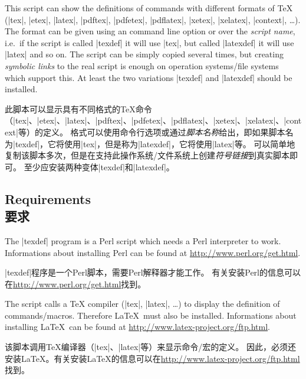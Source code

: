 \documentclass{article}
\begin{document}
This script can show the definitions of commands with different formats of TeX
(|tex|, |etex|, |latex|, |pdftex|, |pdfetex|, |pdflatex|, |xetex|, |xelatex|, |context|, \ldots).
The format can be given using an command line option or over the \emph{script name},
i.e.\ if the script is called |texdef| it will use |tex|, but called |latexdef|
it will use |latex| and so on.
The script can be simply copied several times, but creating \emph{symbolic links}
to the real script is enough on operation systems/file systems which support
this.
At least the two variations |texdef| and |latexdef| should be installed.

此脚本可以显示具有不同格式的TeX命令（|tex|、|etex|、|latex|、|pdftex|、|pdfetex|、|pdflatex|、|xetex|、|xelatex|、|context|等）的定义。
格式可以使用命令行选项或通过\emph{脚本名称}给出，即如果脚本名为|texdef|，它将使用|tex|，但是称为|latexdef|，它将使用|latex|等。
可以简单地复制该脚本多次，但是在支持此操作系统/文件系统上创建\emph{符号链接}到真实脚本即可。
至少应安装两种变体|texdef|和|latexdef|。



\subsection*{Requirements\\要求}

The |texdef| program is a Perl script which needs a Perl interpreter to work.
Informations about installing Perl can be found at \url{http://www.perl.org/get.html}.

|texdef|程序是一个Perl脚本，需要Perl解释器才能工作。
有关安装Perl的信息可以在\url{http://www.perl.org/get.html}找到。

The script calls a TeX compiler (|tex|, |latex|, \ldots) to display the definition of commands/macros.
Therefore \LaTeX\ must also be installed.
Informations about installing \LaTeX\ can be found at \url{http://www.latex-project.org/ftp.html}.

该脚本调用TeX编译器（|tex|、|latex|等）来显示命令/宏的定义。
因此，必须还安装\LaTeX。有关安装\LaTeX 的信息可以在\url{http://www.latex-project.org/ftp.html}找到。
\end{document}
